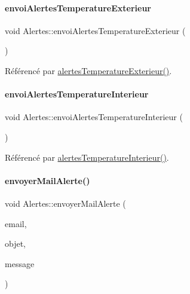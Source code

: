 \paragraph{\texorpdfstring{envoi\+Alertes\+Temperature\+Exterieur}{envoiAlertesTemperatureExterieur}}
{\footnotesize\ttfamily void Alertes\+::envoi\+Alertes\+Temperature\+Exterieur (\begin{DoxyParamCaption}\item[{\hyperlink{parametres_8h_aaa6de8207c94675264c90b10b613368d}{Seuils\+Alertes}}]{ }\end{DoxyParamCaption})\hspace{0.3cm}{\ttfamily [signal]}}



Référencé par \hyperlink{class_alertes_a91fb2665fa8b6c32c74bfe4d1b89a2d8}{alertes\+Temperature\+Exterieur()}.

\mbox{\label{class_alertes_a7726d5049a1453b6c22fafb33693bfe9}} 
\paragraph{\texorpdfstring{envoi\+Alertes\+Temperature\+Interieur}{envoiAlertesTemperatureInterieur}}
{\footnotesize\ttfamily void Alertes\+::envoi\+Alertes\+Temperature\+Interieur (\begin{DoxyParamCaption}\item[{\hyperlink{parametres_8h_aaa6de8207c94675264c90b10b613368d}{Seuils\+Alertes}}]{ }\end{DoxyParamCaption})\hspace{0.3cm}{\ttfamily [signal]}}



Référencé par \hyperlink{class_alertes_a8bc56cf9eb525624b2c1f5b20f86724b}{alertes\+Temperature\+Interieur()}.

\mbox{\label{class_alertes_a375783502a78109f3323dc1ed90cfdc9}} 
\paragraph{\texorpdfstring{envoyer\+Mail\+Alerte()}{envoyerMailAlerte()}}
{\footnotesize\ttfamily void Alertes\+::envoyer\+Mail\+Alerte (\begin{DoxyParamCaption}\item[{Q\+String}]{email,  }\item[{Q\+String}]{objet,  }\item[{Q\+String}]{message }\end{DoxyParamCaption})}



